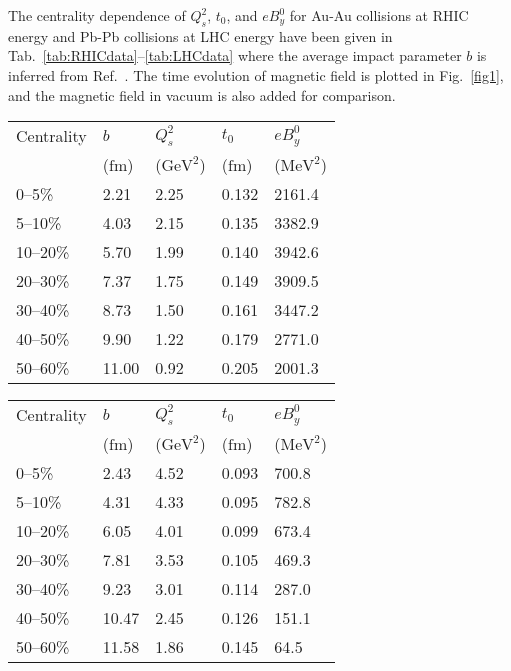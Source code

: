 \documentclass[a4paper,10pt,twoside]{cpc-hepnp}
\begin{document}
\begin{CJK*}{GBK}{song}
\begin{multicols}{2}
The centrality dependence of $Q_s^2$, $t_0$, and $eB_y^0$ for Au-Au collisions at RHIC energy and Pb-Pb collisions at LHC energy have been given in Tab.~\ref{tab:RHICdata}--\ref{tab:LHCdata} where the average impact parameter $b$ is inferred from Ref.~\cite{Ray:2007av,Abelev:2013qoq}. The time evolution of magnetic field is plotted in Fig.~\ref{fig1}, and the magnetic field in vacuum is also added for comparison.

\begin{center}
\footnotesize
\begin{tabular}{lllll}
\toprule
  Centrality & $b$ & $Q_s^2$ & $t_0$ & $eB_y^0$ \\
             & ($\mathrm{fm}$)  &  ($\mathrm{GeV}^2$) & ($\mathrm{fm}$) & ($\mathrm{MeV}^2$) \\
\hline
0--5\% & 2.21 & 2.25 & 0.132 & 2161.4 \\
5--10\% & 4.03 & 2.15 & 0.135 & 3382.9 \\
10--20\% & 5.70 & 1.99 & 0.140 & 3942.6 \\
20--30\% & 7.37 & 1.75 & 0.149 & 3909.5 \\
30--40\% & 8.73 & 1.50 & 0.161 & 3447.2 \\
40--50\% & 9.90 & 1.22 & 0.179 & 2771.0 \\
50--60\% & 11.00 & 0.92 & 0.205 & 2001.3 \\
  \bottomrule
\end{tabular}
\end{center}

\begin{center}
\footnotesize
\begin{tabular}{lllll}
\toprule
  Centrality & $b$ & $Q_s^2$ & $t_0$ & $eB_y^0$ \\
             & ($\mathrm{fm}$)  &  ($\mathrm{GeV}^2$) & ($\mathrm{fm}$) & ($\mathrm{MeV}^2$) \\
\hline
0--5\% & 2.43 & 4.52 & 0.093 & 700.8 \\
5--10\% & 4.31 & 4.33 & 0.095 & 782.8 \\
10--20\% & 6.05 & 4.01 & 0.099 & 673.4 \\
20--30\% & 7.81 & 3.53 & 0.105 & 469.3 \\
30--40\% & 9.23 & 3.01 & 0.114 & 287.0 \\
40--50\% & 10.47 & 2.45 & 0.126 & 151.1 \\
50--60\% & 11.58 & 1.86 & 0.145 & 64.5 \\
  \bottomrule
\end{tabular}
\end{center}


\end{multicols}
\end{CJK*}
\end{document}
